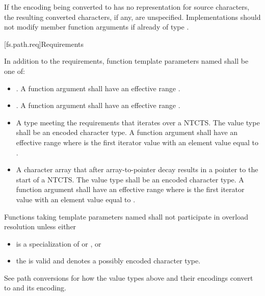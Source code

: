 \pnum
If the encoding being converted to has no representation for source
characters, the resulting converted characters, if any, are unspecified.
Implementations should not modify member function arguments
if already of type .

[fs.path.req]{Requirements}

\pnum
In addition to the requirements,
function template parameters named 
shall be one of:
\begin{itemize}
\item {}. A function
  argument   shall have an
  effective range .
\item {}. A function
  argument   shall have an
  effective range .
\item A type meeting the  requirements that iterates over a NTCTS\@.
  The value type shall be an encoded character type. A function argument
    shall have an effective range
   where  is the first
  iterator value with an element value equal to
  .
\item A character array that after array-to-pointer decay results in a
  pointer to the start of a NTCTS\@. The value type shall be an encoded character type. A
  function argument   shall
  have an effective range  where
   is the first iterator value with an element value equal to
  .
\end{itemize}

\pnum
Functions taking template parameters named 
shall not participate in overload resolution unless either
\begin{itemize}
\item
{} is a specialization of
 or , or
\item
the   is valid and
denotes a possibly  encoded character type.
\end{itemize}

\pnum
\begin{note}
See path conversions
for how the value types above and their encodings convert to
 and its encoding.
\end{note}

